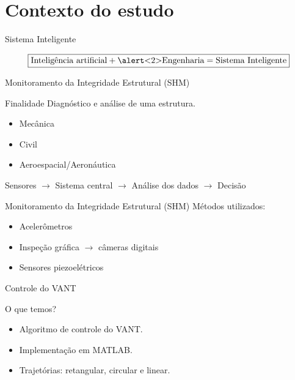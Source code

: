 \section{Contexto do estudo}

\begin{frame}{Sistema Inteligente}

\[\boxed{\text{Inteligência artificial} + \text{\alert<2>{Engenharia}} = \text{Sistema Inteligente}}\] 
    
\end{frame}

\begin{frame}{Monitoramento da Integridade Estrutural (SHM)}

\begin{block}{Finalidade}
    Diagnóstico e análise de uma estrutura.
\end{block} \pause

\begin{itemize}
    \item Mecânica
    \item Civil
    \item Aeroespacial/Aeronáutica
\end{itemize} \pause

Sensores \(\rightarrow\) Sistema central \(\rightarrow\) Análise dos dados \(\rightarrow\) Decisão
\end{frame}
\pause
\begin{frame}{Monitoramento da Integridade Estrutural (SHM)}
Métodos utilizados:

\begin{itemize}
    \item Acelerômetros
    \item Inspeção gráfica \(\rightarrow\) câmeras digitais
    \item \alert<2>{Sensores piezoelétricos}
\end{itemize}

\end{frame}

\begin{frame}{Controle do VANT}
\pause

\begin{block}{O que temos?}
    \begin{itemize}
        \item Algoritmo de controle do VANT.
        \item Implementação em MATLAB.
        \item Trajetórias: retangular, circular e linear.
    \end{itemize}
\end{block} \pause
\begin{figure}
    \centering
    
    \end{figure}
\end{frame}


